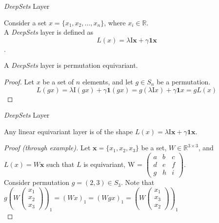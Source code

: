\documentclass{beamer}
\begin{document}
\begin{frame}{\emph{DeepSets} Layer}

    \begin{definition}
        Consider a set $x = \{x_1, x_2, \ldots, x_n\}$, where $x_i \in \mathbb{R}$.\\
        A \emph{DeepSets} layer is defined as 
        \[L(x) = \lambda\mathrm{I}\mathbf{x} + \gamma\mathbf{1}\mathbf{x}\].
    \end{definition}

    \pause
    \begin{theorem}
        A \emph{DeepSets} layer is permutation equivariant.
    \end{theorem}

    \pause
    \begin{proof}
        Let $x$ be a set of $n$ elements, and let $g \in S_n$ be a permutation.
        \pause
        \[ L(gx) = \lambda\mathrm{I}(gx) + \gamma\mathbf{1}(gx) = g(\lambda\mathrm{I}x) + \gamma\mathbf{1}x = gL(x)\]
    \end{proof}
\end{frame}
\begin{frame}{\emph{DeepSets} Layer}
    \begin{theorem}
        Any linear equivariant layer is of the shape \(L(x) = \lambda\mathrm{I}\mathbf{x} + \gamma\mathbf{1}\mathbf{x}\).
    \end{theorem}

    \pause
    \renewcommand{\qedsymbol}{}
    \begin{proof}[Proof (through example)]
        Let $\mathbf{x}=\{x_1,x_2,x_3\}$ be a set, $W \in \mathbb{R}^{3 \times 3}$, and $L(x) = W\mathbf{x}$ such that $L$ is equivariant, W = $\begin{pmatrix}
            a & b & c\\
            d & e & f\\
            g & h & i
        \end{pmatrix}$.\\
        \pause
        Consider permutation $g=(2,3) \in S_3$. Note that $g\left(W\begin{pmatrix}
            x_1\\
            x_2\\
            x_3
        \end{pmatrix}\right)_1=(Wx)_1 = (Wgx)_1 = \left(W\begin{pmatrix}
            x_1\\
            x_3\\
            x_2
        \end{pmatrix}\right)_1$\\
    \end{proof}
    \renewcommand{\qedsymbol}{\ensuremath{\square}} 
\end{frame}
\end{document}
